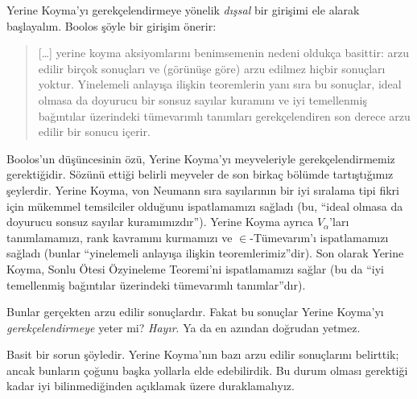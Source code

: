 


Yerine Koyma'yı gerekçelendirmeye yönelik \emph{dışsal} bir girişimi ele
alarak başlayalım. Boolos şöyle bir girişim önerir:
\begin{quote}
  [\ldots] yerine koyma aksiyomlarını benimsemenin nedeni oldukça basittir:
  arzu edilir birçok sonuçları ve (görünüşe göre) arzu edilmez hiçbir
  sonuçları yoktur. Yinelemeli anlayışa ilişkin teoremlerin yanı sıra bu
  sonuçlar, ideal olmasa da doyurucu bir sonsuz sayılar kuramını ve iyi
  temellenmiş bağıntılar üzerindeki tümevarımlı tanımları gerekçelendiren son
  derece arzu edilir bir sonucu içerir.
  \citep[229]{Boolos1971}
\end{quote}		
Boolos'un düşüncesinin özü, Yerine Koyma'yı meyveleriyle gerekçelendirmemiz
gerektiğidir. Sözünü ettiği belirli meyveler de son birkaç bölümde
tartıştığımız şeylerdir. Yerine Koyma, von Neumann sıra sayılarının bir iyi
sıralama tipi fikri için mükemmel temsilciler olduğunu ispatlamamızı sağladı
(bu, ``ideal olmasa da doyurucu sonsuz sayılar kuramımızdır''). Yerine Koyma
ayrıca $V_\alpha$'ları tanımlamamızı, rank kavramını kurmamızı ve
$\in$-Tümevarım'ı ispatlamamızı sağladı (bunlar ``yinelemeli anlayışa ilişkin
teoremlerimiz''dir). Son olarak Yerine Koyma, Sonlu Ötesi Özyineleme
Teoremi'ni ispatlamamızı sağlar (bu da ``iyi temellenmiş bağıntılar üzerindeki
tümevarımlı tanımlar''dır).

Bunlar gerçekten arzu edilir sonuçlardır. Fakat bu sonuçlar Yerine Koyma'yı
\emph{gerekçelendirmeye} yeter mi? \emph{Hayır}. Ya da en azından doğrudan
yetmez.

Basit bir sorun şöyledir. Yerine Koyma'nın bazı arzu edilir sonuçlarını
belirttik; ancak bunların çoğunu başka yollarla elde edebilirdik. Bu durum
olması gerektiği kadar iyi bilinmediğinden açıklamak üzere duraklamalıyız.

